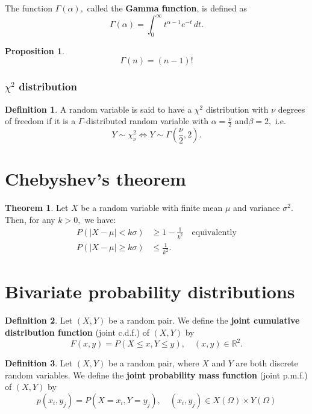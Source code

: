 \documentclass[12pt, a4paper]{article}
\newcommand{\bb}[1]{\mathbb{#1}}
\newcommand{\f}[2]{\frac{#1}{#2}}
\theoremstyle{definition}
\newtheorem{definition}{Definition}[section]
\newtheorem{theorem}{Theorem}[section]
\newtheorem{proposition}{Proposition}
\theoremstyle{plain}
\begin{document}
The function $\Gamma(\alpha),$ called the \textbf{Gamma function}, is defined as $$\Gamma(\alpha)=\int_{0}^{\infty} t^{\alpha-1}e^{-t}\,dt.$$

\begin{proposition}
$$\Gamma(n)=(n-1)!$$
\end{proposition}

\subsubsection{\texorpdfstring{$\chi^2$}{TEXT} distribution}

\begin{definition}
A random variable is said to have a $\chi^2$ distribution with $\nu$ degrees of freedom if it is a $\Gamma$-distributed random variable with $\alpha = \f{\nu}{2}$ and$ \beta = 2,$ i.e. $$Y\sim \chi^2_\nu \iff Y \sim \Gamma\left(\frac{\nu}{2},2\right).$$
\end{definition}

\section{Chebyshev’s theorem}

\begin{theorem}
Let $X$ be a random variable with finite mean $\mu$ and variance $\sigma^2.$ Then, for any $k > 0,$ we have: $$\begin{aligned} P(|X-\mu|<k\sigma)&\geq 1-\frac{1}{k^2} \quad \text{equivalently} \\ P(|X-\mu|\geq k\sigma)&\leq\frac{1}{k^2}.\end{aligned}$$
\end{theorem}

\section{Bivariate probability distributions}

\begin{definition}
Let $(X , Y )$ be a random pair. We define the \textbf{joint cumulative distribution function} (joint c.d.f.) of $(X , Y )$ by $$F(x,y)=P(X\leq x, Y\leq y), \quad (x,y)\in \bb{R}^2.$$
\end{definition}

\begin{definition}
Let $(X , Y )$ be a random pair, where $X$ and $Y$ are both discrete random variables. We define the \textbf{joint probability mass function} (joint p.m.f.) of $(X,Y)$ by $$p(x_i,y_j)=P(X=x_i,Y=y_j), \quad (x_i,y_j)\in X(\Omega)\times Y(\Omega)$$
\end{definition}
\end{document}
